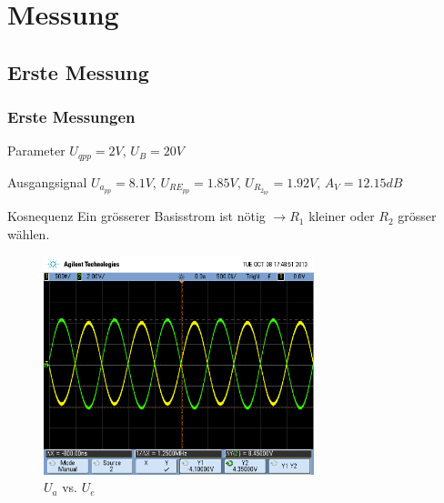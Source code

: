 \section{Messung}

\subsection{Erste Messung}

\begin{frame}
	\frametitle{Erste Messungen}
	\begin{block}{Parameter}
	$U_{qpp} = 2V$, $U_B = 20V$
	\end{block}

	\begin{block}{Ausgangsignal}
	$U_{a_{pp}} = 8.1V$, $U_{RE_{pp}} = 1.85V$, $U_{R_{2_{pp}}} = 1.92V$,
	$A_V = 12.15dB$
	\end{block}

	\begin{alertblock}{Kosnequenz}
	Ein grösserer Basisstrom ist nötig $\rightarrow R_1$ kleiner oder 
	$R_2$ grösser wählen.
	\end{alertblock}	
	
\end{frame}

\begin{frame}
	\begin{figure}
		\centering
		\includegraphics[width=0.7\textwidth]{scope_0.png}
		\caption{$U_a$ vs. $U_e$}
	\end{figure}
\end{frame}

